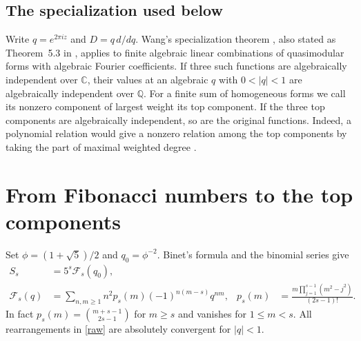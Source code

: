 \documentclass[11pt]{article}
\newcommand{\QQ}{\mathbb Q}
\newcommand{\CC}{\mathbb C}
\newcommand{\F}{\mathcal F}
\begin{document}
\subsection*{The specialization used below}
Write $q=e^{2\pi iz}$ and $D=q\,d/dq$. Wang's specialization theorem \cite[Theorem 3.5]{Wang2024}, also stated as Theorem~5.3 in \cite{Wang2025}, applies to finite algebraic linear combinations of quasimodular forms with algebraic Fourier coefficients. If three such functions are algebraically independent over $\CC$, their values at an algebraic $q$ with $0<|q|<1$ are algebraically independent over $\QQ$. For a finite sum of homogeneous forms we call its nonzero component of largest weight its top component. If the three top components are algebraically independent, so are the original functions. Indeed, a polynomial relation would give a nonzero relation among the top components by taking the part of maximal weighted degree \cite[Lemma 5.4]{Wang2025}.

\clearpage
\section{From Fibonacci numbers to the top components}
Set $\phi=(1+\sqrt5)/2$ and $q_0=\phi^{-2}$. Binet's formula and the binomial series give
\begin{align}
 S_s&=5^s\F_s(q_0),\nonumber\\
 \F_s(q)&=\sum_{n,m\ge1}n^2 p_s(m)(-1)^{n(m-s)}q^{nm},&
 p_s(m)&=\frac{m\prod_{j=1}^{s-1}(m^2-j^2)}{(2s-1)!}.\label{raw}
\end{align}
In fact $p_s(m)=\binom{m+s-1}{2s-1}$ for $m\ge s$ and vanishes for $1\le m<s$. All rearrangements in \eqref{raw} are absolutely convergent for $|q|<1$.
\end{document}
